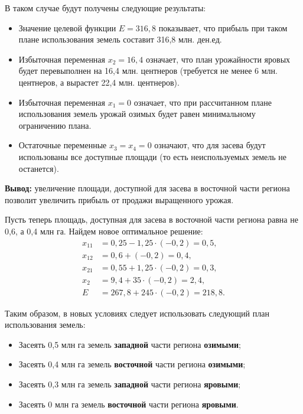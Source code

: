 В таком случае будут получены следующие результаты:
\begin{itemize}
\item Значение целевой функции $ E = 316{,}8 $ показывает, что прибыль при таком
  плане использования земель составит 316{,}8 млн. ден.ед.
\item Избыточная переменная $ x_{2} = 16{,}4 $ означает, что план урожайности яровых 
  будет перевыполнен на 16{,}4 млн. центнеров (требуется не менее 6 млн. центнеров, а
  вырастет 22{,}4 млн. центнеров).
\item Избыточная переменная $ x_{1} = 0 $ означает, что при рассчитанном плане использования
  земель урожай озимых будет равен минимальному ограничению плана.
\item Остаточные переменные $ x_{3} = x_{4} = 0 $ означают, что для засева будут
  использованы все доступные площади (то есть неиспользуемых земель не останется).
\end{itemize}

\textbf{Вывод:} увеличение площади, доступной для засева в восточной части региона позволит
увеличить прибыль от продажи выращенного урожая.

Пусть теперь площадь, доступная для засева в восточной части региона равна не 0{,}6, а 0{,}4 млн га.
Найдем новое оптимальное решение: 
\begin{equation}
    \begin{aligned}
      x_{11} &= 0{,}25 - 1{,}25 \cdot (-0{,}2) = 0{,}5, \\
      x_{12} &= 0{,}6 + (-0{,}2) = 0{,}4, \\
      x_{21} &= 0{,}55 + 1{,}25 \cdot (-0{,}2) = 0{,}3, \\
      x_{2} &= 9{,}4 + 35 \cdot (-0{,}2) = 2{,}4, \\
      E &= 267{,}8 + 245 \cdot (-0{,}2) = 218{,}8.
    \end{aligned}
\end{equation}

Таким образом, в новых условиях следует использовать следующий план использования земель:
\begin{itemize}
\item Засеять 0{,}5 млн га земель \textbf{западной} части региона \textbf{озимыми};
\item Засеять 0{,}4 млн га земель \textbf{восточной} части региона \textbf{озимыми};
\item Засеять 0{,}3 млн га земель \textbf{западной} части региона \textbf{яровыми};
\item Засеять 0 млн га земель \textbf{восточной} части региона \textbf{яровыми}.
\end{itemize}

